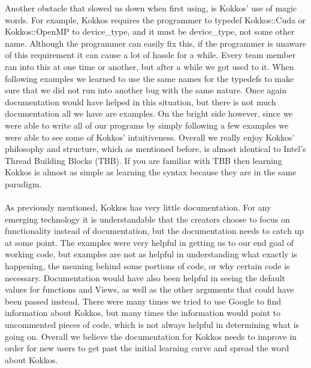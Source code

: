 Another obstacle that slowed us down when first using, is Kokkos' use of magic words. For example, Kokkos requires the programmer to typedef Kokkos::Cuda or Kokkos::OpenMP to device\_type, and it must be device\_type, not some other name. Although the programmer can easily fix this, if the programmer is unaware of this requirement it can cause a lot of hassle for a while. Every team member ran into this at one time or another, but after a while we got used to it. When following examples we learned to use the same names for the typedefs to make sure that we did not run into another bug with the same nature. Once again documentation would have helped in this situation, but there is not much documentation all we have are examples. On the bright side however, since we were able to write all of our programs by simply following a few examples we were able to see some of Kokkos' intuitiveness. Overall we really enjoy Kokkos' philosophy and structure, which as mentioned before, is almost identical to Intel's Thread Building Blocks (TBB). If you are familiar with TBB then learning Kokkos is almost as simple as learning the syntax because they are in the same paradigm. \\
\\
As previously mentioned, Kokkos has very little documentation. For any emerging technology it is understandable that the creators choose to focus on functionality instead of documentation, but the documentation needs to catch up at some point. The examples were very helpful in getting us to our end goal of working code, but examples are not as helpful in understanding what exactly is happening, the meaning behind some portions of code, or why certain code is necessary. Documentation would have also been helpful in seeing the default values for functions and Views, as well as the other arguments that could have been passed instead. There were many times we tried to use Google to find information about Kokkos, but many times the information would point to uncommented pieces of code, which is not always helpful in determining what is going on. Overall we believe the documentation for Kokkos needs to improve in order for new users to get past the initial learning curve and spread the word about Kokkos. \\
\\
